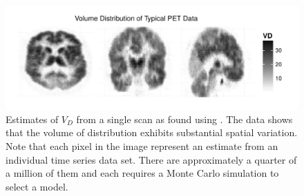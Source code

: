 \begin{figure}[t]
  \UseAltLinespread
  \includegraphics[width=\linewidth]{fig_src/PETPlot-smc2-ps-bw}
  \caption[Volume of distribution of real \protect\pet compartmental model
  data]
  {Estimates of $V_D$ from a single \pet scan as found using \smc[2].
    The data shows that the volume of distribution exhibits substantial
    spatial variation. Note that each pixel in the image represent an estimate
    from an individual time series data set. There are approximately a quarter
    of a million of them and each requires a Monte Carlo simulation to select
    a model.}
  \label{fig:petplot}
\end{figure}
